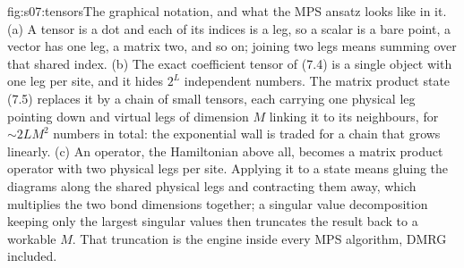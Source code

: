 %
\begin{aqmfigure}{fig:s07:tensors}{The graphical notation, and what the MPS ansatz looks like in it.
(a) A tensor is a dot and each of its indices is a leg, so a scalar is a bare point, a vector has one
leg, a matrix two, and so on; joining two legs means summing over that shared index. (b) The exact
coefficient tensor of (7.4) is a single object with one leg per site, and it hides $2^L$ independent
numbers. The matrix product state (7.5) replaces it by a chain of small tensors, each carrying one
physical leg pointing down and virtual legs of dimension $M$ linking it to its neighbours, for
$\sim 2LM^2$ numbers in total: the exponential wall is traded for a chain that grows linearly. (c) An
operator, the Hamiltonian above all, becomes a matrix product operator with two physical legs per
site. Applying it to a state means gluing the diagrams along the shared physical legs and contracting
them away, which multiplies the two bond dimensions together; a singular value decomposition keeping
only the largest singular values then truncates the result back to a workable $M$. That truncation is
the engine inside every MPS algorithm, DMRG included.}

\end{aqmfigure}
